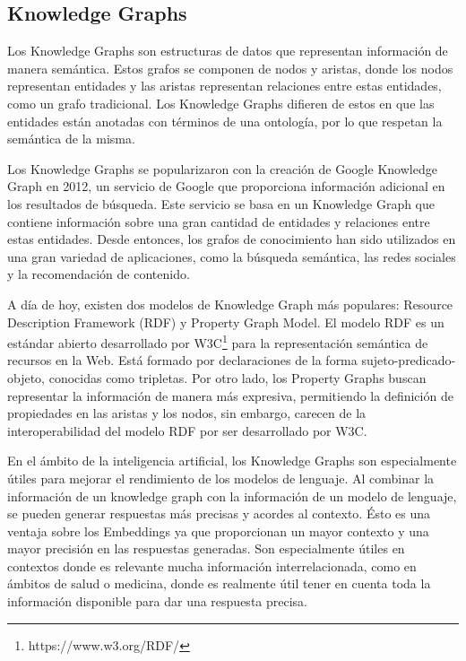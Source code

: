 \subsection{Knowledge Graphs}
Los Knowledge Graphs son estructuras de datos que representan información de manera semántica. Estos grafos se componen de nodos y aristas, donde los nodos representan entidades y las aristas representan relaciones entre estas entidades, como un grafo tradicional. Los Knowledge Graphs difieren de estos en que las entidades están anotadas con términos de una ontología, por lo que respetan la semántica de la misma.  

Los Knowledge Graphs se popularizaron con la creación de Google Knowledge Graph en 2012, un servicio de Google que proporciona información adicional en los resultados de búsqueda. Este servicio se basa en un Knowledge Graph que contiene información sobre una gran cantidad de entidades y relaciones entre estas entidades. Desde entonces, los grafos de conocimiento han sido utilizados en una gran variedad de aplicaciones, como la búsqueda semántica, las redes sociales y la recomendación de contenido.

A día de hoy, existen dos modelos de Knowledge Graph más populares: Resource Description Framework (RDF) y Property Graph Model. El modelo RDF es un estándar abierto desarrollado por W3C\footnote{https://www.w3.org/RDF/} para la representación semántica de recursos en la Web. Está formado por declaraciones de la forma sujeto-predicado-objeto, conocidas como tripletas. Por otro lado, los Property Graphs buscan representar la información de manera más expresiva, permitiendo la definición de propiedades en las aristas y los nodos, sin embargo, carecen de la interoperabilidad del modelo RDF por ser desarrollado por W3C. 

En el ámbito de la inteligencia artificial, los Knowledge Graphs son especialmente útiles para mejorar el rendimiento de los modelos de lenguaje. Al combinar la información de un knowledge graph con la información de un modelo de lenguaje, se pueden generar respuestas más precisas y acordes al contexto. Ésto es una ventaja sobre los Embeddings ya que proporcionan un mayor contexto y una mayor precisión en las respuestas generadas. Son especialmente útiles en contextos donde es relevante mucha información interrelacionada, como en ámbitos de salud o medicina, donde es realmente útil tener en cuenta toda la información disponible para dar una respuesta precisa.